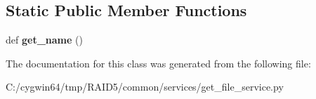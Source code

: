\subsection*{Static Public Member Functions}
\begin{DoxyCompactItemize}
\item 
\mbox{\label{class_r_a_i_d5_1_1common_1_1services_1_1get__file__service_1_1_get_file_service_a0fe3b8bcbdec3b2b0a7ae156f8076121}} 
def {\bfseries get\+\_\+name} ()
\end{DoxyCompactItemize}


The documentation for this class was generated from the following file\+:\begin{DoxyCompactItemize}
\item 
C\+:/cygwin64/tmp/\+R\+A\+I\+D5/common/services/get\+\_\+file\+\_\+service.\+py\end{DoxyCompactItemize}
